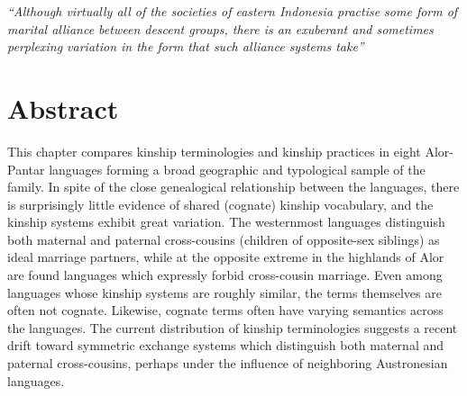 \begin{figure}
\caption{}
\end{figure}

\clearpage

\begin{figure}
\caption{}
\end{figure}

\begin{figure}
\caption{}
\end{figure}


\begin{figure}
\caption{}
\end{figure}



\textit{``Although virtually all of the societies of eastern Indonesia practise some form of marital alliance between descent groups, there is an exuberant and sometimes perplexing variation in the form that such alliance systems take''} \citep[33]{Blust1993}

\section*{Abstract} This chapter compares kinship terminologies and kinship practices in eight Alor-Pantar languages forming a broad geographic and typological sample of the family. In spite of the close genealogical relationship between the languages, there is surprisingly little evidence of shared (cognate) kinship vocabulary, and the kinship systems exhibit great variation. The westernmost languages distinguish both maternal and paternal cross-cousins (children of opposite-sex siblings) as ideal marriage partners, while at the opposite extreme in the highlands of Alor are found languages which expressly forbid cross-cousin marriage. Even among languages whose kinship systems are roughly similar, the terms themselves are often not cognate. Likewise, cognate terms often have varying semantics across the languages. The current distribution of kinship terminologies suggests a recent drift toward symmetric exchange systems which distinguish both maternal and paternal cross-cousins, perhaps under the influence of neighboring Austronesian languages.

